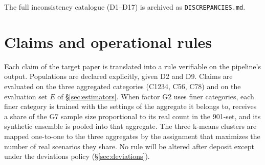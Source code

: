 \documentclass[11pt,a4paper]{article}
\newcommand{\prop}[1]{#1}
\newcommand{\prop}[1]{\textcolor{blue}{#1}}
\begin{document}
The full inconsistency catalogue (D1--\prop{D17}) is archived as
\texttt{DISCREPANCIES.md}.

\section{Claims and operational rules}\label{sec:claims}
Each claim of the target paper is translated into a rule verifiable on the
pipeline's output. Populations are declared explicitly, given D2 and D9.
Claims are evaluated on the three aggregated categories (C1234, C56, C78)
and on the evaluation set $E$ of \S\ref{sec:estimators}. When factor
G2 uses finer categories, each finer category is trained with the settings
of the aggregate it belongs to, receives a share of the G7 sample size
proportional to its real count in the 901-set, and its synthetic ensemble
is pooled into that aggregate. The three k-means clusters are mapped
one-to-one to the three aggregates by the assignment that maximizes the
number of real scenarios they share. No rule
will be altered after deposit except under the deviations policy
(\S\ref{sec:deviations}).
\end{document}
